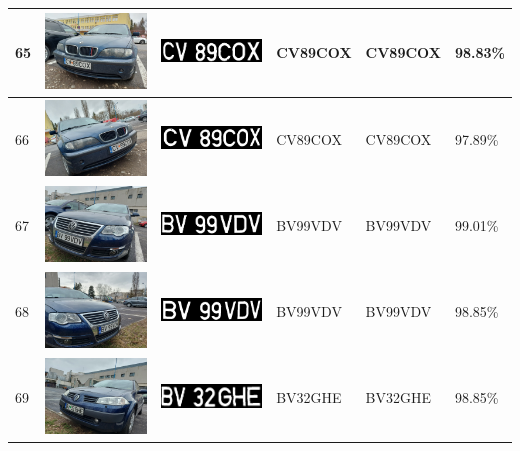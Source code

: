 \documentclass[a4paper,12pt]{report}
\begin{document}
\begin{longtable}{| m{0.6cm} | m{3cm} | m{3cm} | m{1.8cm} | m{1.8cm} | m{1.8cm} |}
        65 & \includegraphics[width=3cm,keepaspectratio]{dataset/37_d1.jpg} & \includegraphics[width=3cm,keepaspectratio]{segmentari/65.jpg} & CV89COX & CV89COX & 98.83\% \\ \hline
        66 & \includegraphics[width=3cm,keepaspectratio]{dataset/37_s1.jpg} & \includegraphics[width=3cm,keepaspectratio]{segmentari/66.jpg} & CV89COX & CV89COX & 97.89\% \\ \hline
        67 & \includegraphics[width=3cm,keepaspectratio]{dataset/38_d1.jpg} & \includegraphics[width=3cm,keepaspectratio]{segmentari/67.jpg} & BV99VDV & BV99VDV & 99.01\% \\ \hline
        68 & \includegraphics[width=3cm,keepaspectratio]{dataset/38_s1.jpg} & \includegraphics[width=3cm,keepaspectratio]{segmentari/68.jpg} & BV99VDV & BV99VDV & 98.85\% \\ \hline
        69 & \includegraphics[width=3cm,keepaspectratio]{dataset/39_d1.jpg} & \includegraphics[width=3cm,keepaspectratio]{segmentari/69.jpg} & BV32GHE & BV32GHE & 98.85\% \\ \hline

\end{longtable}
\end{document}
